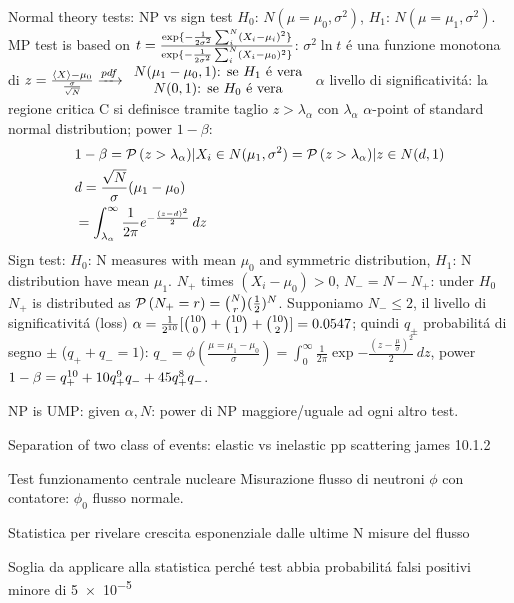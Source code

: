 \begin{wordonframe}{Normal theory tests: NP vs sign test}
$H_0$: $N(\mu=\mu_0,\sigma^2)$, $H_1$: $N(\mu=\mu_1,\sigma^2)$.
MP test is based on $t=\frac{\text{exp}\{-\frac{1}{2\sigma^2}\sum_i^N(X_i-\mu_i)^2\}}{\text{exp}\{-\frac{1}{2\sigma^2}\sum_i^N(X_i-\mu_0)^2\}}$: $\sigma^2\ln{t}$ \'e una funzione monotona di $z=\frac{\langle X \rangle-\mu_0}{\frac{\sigma}{\sqrt{N}}}\xrightarrow{pdf}\begin{array}{c}N(\mu_1-\mu_0,1) \text{: se $H_1$ \'e vera}\\
N(0,1) \text{: se $H_0$ \'e vera}
\end{array}$
$\alpha$ livello di significativit\'a: la regione critica C si definisce tramite taglio $z>\lambda_{\alpha}$ con $\lambda_{\alpha}$ $\alpha$-point of standard normal distribution; power $1-\beta$:
\begin{align*}
&1-\beta=\operatorname{\mathcal{P}}{(z>\lambda_{\alpha})|X_i\in N(\mu_1,\sigma^2)}=\operatorname{\mathcal{P}}{(z>\lambda_{\alpha})|z\in N(d,1)}\\
&d=\frac{\sqrt{N}}{\sigma}(\mu_1-\mu_0)\\
&=\int_{\lambda_{\alpha}}^{\infty}\frac{1}{2\pi}e^{-\frac{(z-d)^2}{2}}\,dz
\end{align*}
Sign test:
$H_0$: N measures with mean $\mu_0$ and symmetric distribution, $H_1$: N distribution have mean $\mu_1$. $N_+$ times $(X_i-\mu_0)>0$, $N_-=N-N_+$: under $H_0$ $N_+$ is distributed as $\operatorname{\mathcal{P}}{(N_+=r)}=\binom{N}{r}(\frac{1}{2})^N$. Supponiamo $N_-\leq2$, il livello di significativit\'a  (loss) $\alpha=\frac{1}{2^{10}}[\binom{10}{0}+\binom{10}{1}+\binom{10}{2}]=0.0547$; quindi $q_{\pm}$ probabilit\'a di segno $\pm$ ($q_++q_-=1$): $q_-=\phi(\frac{\mu=\mu_1-\mu_0}{\sigma})=\int_0^{\infty}\frac{1}{2\pi}\exp{-\frac{(z-\frac{\mu}{\sigma})^2}{2}}\,dz$, power $1-\beta=q_+^{10}+10q_+^9q_-+45q_+^8q_-$.

NP is UMP: given $\alpha, N$: power di NP maggiore/uguale ad ogni altro test.
\end{wordonframe}

\begin{frame}{Separation of two class of events: elastic vs inelastic pp scattering}
james 10.1.2
\end{frame}

\begin{frame}{Test funzionamento centrale nucleare}\frameintoc
Misurazione flusso di neutroni $\phi$ con contatore: $\phi_0$ flusso normale.
\begin{block}{Statistica per rivelare crescita esponenziale dalle ultime N misure del flusso}

\end{block}
\begin{block}{Soglia da applicare alla statistica perch\'e test abbia probabilit\'a falsi positivi minore di \num{5e-5}}

\end{block}
\end{frame}

